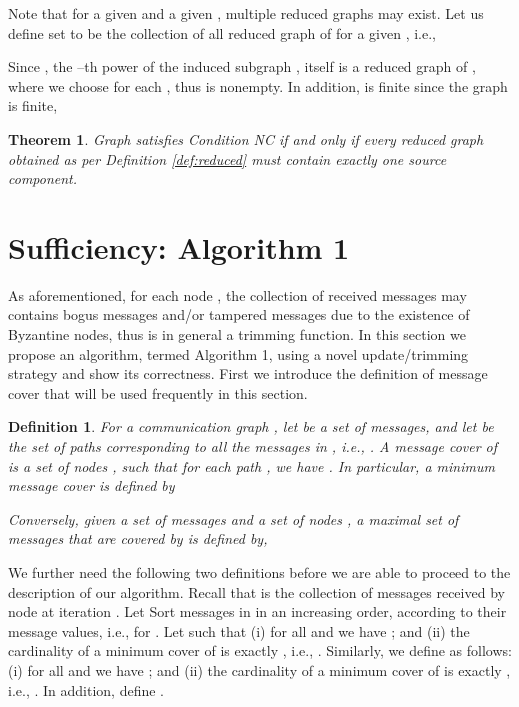 \documentclass[letterpaper, 11pt]{article}
\newtheorem{definition}{Definition}[section]
\newtheorem{theorem}{Theorem}[section]
\begin{document}
Note that for a given  and a given ,
multiple reduced graphs may exist.
Let us define set  to be the collection of all reduced graph of  for a given , i.e.,



Since , the --th power of the induced subgraph , itself is a reduced graph of , where we choose  for each , thus  is nonempty.
 In addition,  is finite since the graph  is finite,


\begin{theorem}
\label{thm:nc2}
Graph  satisfies Condition NC if and only if every reduced graph  obtained as per Definition \ref{def:reduced}
must contain exactly one {\em source component}.
\end{theorem}


\section{Sufficiency: Algorithm 1}
\label{sec:sufficiency}

As aforementioned, for each node , the collection of received messages  may contains bogus messages and/or tampered messages due to the existence of Byzantine nodes, thus  is in general a trimming function. In this section we propose an algorithm, termed Algorithm 1, using a novel update/trimming strategy and show its correctness. First we introduce the definition of message cover that will be used frequently in this section. 











\begin{definition}

  For a communication graph , let  be a set of messages, and let  be the set of paths corresponding to all the messages in , i.e., . A message cover of  is a set of nodes , such that for each path , we have . In particular, a minimum message cover is defined by


 Conversely, given a set of messages  and a set of nodes , a maximal set of messages  that are covered by  is defined by,
 
\end{definition}

We further need the following two definitions before we are able to proceed to the description of our algorithm. Recall that  is the collection of messages received by node  at iteration . Let 
Sort messages in  in an increasing order, according to their message values, i.e.,  for .
Let  such that
(i) for all  and  we have ;
and (ii) the cardinality of a minimum cover of  is exactly , i.e., .
Similarly, we define  as follows:
(i) for all  and  we have ;
and (ii) the cardinality of a minimum cover of  is exactly , i.e., .
In addition, define .
\end{document}
